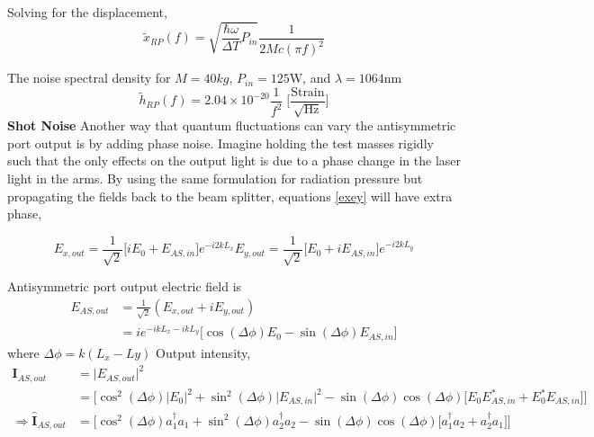 		Solving for the displacement,
		\begin{equation}
		\tilde{x}_{RP}(f) = \sqrt{\frac{\hbar \omega}{\Delta T} P_{in}} \frac{1}{2Mc (\pi f)^2}
		\end{equation}
	
		The noise spectral density for $M=40kg$, $P_{in}=125$W, and $\lambda=1064$nm
		\begin{equation}
		\tilde{h}_{RP}(f) = 2.04\times 10^{-20} \frac{1}{f^2} \; \bigg[ \frac{\text{Strain}}{\sqrt{\text{Hz}}}\bigg]
		\end{equation}
		\textbf{Shot Noise}
		Another way that quantum fluctuations can vary the antisymmetric port output is by adding phase noise.  Imagine holding the test masses rigidly such that the only effects on the output light is due to a phase change in the laser light in the arms. By using the same formulation for radiation pressure but propagating the fields back to the beam splitter, equations \ref{exey} will have extra phase,
		
		\begin{subequations}\label{exeyout}
		\begin{equation}
		E_{x,out} = \frac{1}{\sqrt{2}} \bigg[ iE_0 +   E_{AS,in} \bigg] e^{-i2kL_x}
		\end{equation}
		\begin{equation}
		E_{y,out} = \frac{1}{\sqrt{2}} \bigg[  E_0 + i E_{AS,in} \bigg] e^{-i2kL_y}
		\end{equation}
		\end{subequations}
		
		Antisymmetric port output electric field is
		\begin{equation}
		\begin{aligned}
		E_{AS,out} 	&= \frac{1}{\sqrt{2}} (E_{x,out} + iE_{y,out})\\
					&= i e^{-ikL_x-ikL_y} \big[\cos(\Delta \phi) E_0 - \sin(\Delta \phi) E_{AS,in}\big]
		\end{aligned}
		\end{equation}
		where $\Delta \phi = k(L_x-Ly)$
		Output intensity,
		\begin{equation}
		\begin{aligned}
		\mathbf{I}_{AS,out} 		&= \vert E_{AS,out}\vert^2 \\
									&= \bigg[ \cos^2(\Delta \phi)\vert E_0\vert^2 + \sin^2(\Delta\phi)\vert E_{AS,in}\vert^2 - \sin(\Delta\phi)\cos(\Delta\phi) \big[E_0 E^*_{AS,in} + E_0^* E_{AS,in}\big] \bigg]\\
		\Rightarrow	
		\hat{\mathbf{I}}_{AS,out} 	&= \bigg[ \cos^2(\Delta \phi)a_1^{\dagger}a_1 + \sin^2(\Delta\phi)a_2^{\dagger}a_2 - \sin(\Delta\phi)\cos(\Delta \phi) \big[a_1^{\dagger}a_2 + a_2^{\dagger}a_1 \big] \bigg]\\	
		\end{aligned}
		\end{equation}
		
